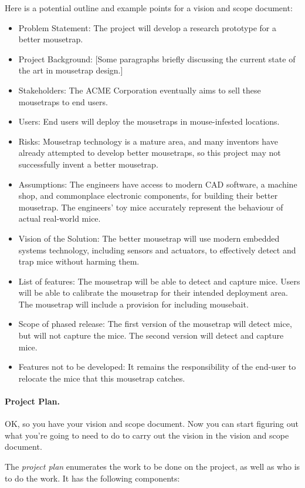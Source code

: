 Here is a potential outline and example points for a vision and scope
document:
\begin{itemize}
\item Problem Statement: The project will develop a research prototype for a
better mousetrap.
\item Project Background: [Some paragraphs briefly discussing the
  current state of the art in mousetrap design.]
\item Stakeholders: The ACME Corporation eventually aims to sell these
  mousetraps to end users.
\item Users: End users will deploy the mousetraps in mouse-infested
  locations.
\item Risks: Mousetrap technology is a mature area, and many inventors
  have already attempted to develop better mousetraps, so this project
  may not successfully invent a better mousetrap.
\item Assumptions: The engineers have access to modern CAD software, a
  machine shop, and commonplace electronic components, for building
  their better mousetrap. The engineers' toy mice accurately represent
  the behaviour of actual real-world mice.
\item Vision of the Solution: The better mousetrap will use modern
  embedded systems technology, including sensors and actuators, to 
  effectively detect and trap mice without harming them.
\item List of features: The mousetrap will be able to detect and capture
  mice. Users will be able to calibrate the mousetrap for their intended
  deployment area. The mousetrap will include a provision for including 
  mousebait.
\item Scope of phased release: The first version of the mousetrap will
  detect mice, but will not capture the mice. The second version will
  detect and capture mice.
\item Features not to be developed: It remains the responsibility of the
  end-user to relocate the mice that this mousetrap catches.
\end{itemize}

\paragraph{Project Plan.} OK, so you have your vision and scope document.
Now you can start figuring out what you're going to need to do to
carry out the vision in the vision and scope document. 

The \emph{project plan} enumerates the work to be done on the project,
as well as who is to do the work. It has the following components:

